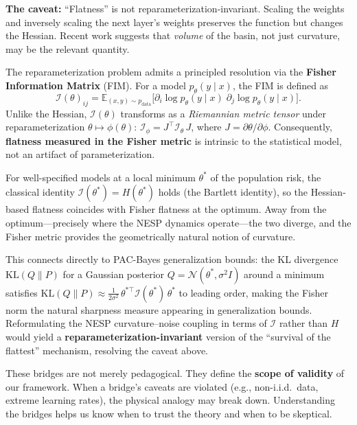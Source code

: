 \documentclass[
  journal=largetwo,
  year=2025,
  volume=37,
]{cup-journal}
\begin{document}
\textbf{The caveat:} ``Flatness'' is not reparameterization-invariant. Scaling the weights and inversely scaling the next layer's weights preserves the function but changes the Hessian. Recent work suggests that \textit{volume} of the basin, not just curvature, may be the relevant quantity.

\begin{remark}\label{rmk:fisher_flatness}
The reparameterization problem admits a principled resolution via the \textbf{Fisher Information Matrix} (FIM). For a model $p_\theta(y \mid x)$, the FIM is defined as
\begin{equation}\label{eq:fisher_information}
    \mathcal{I}(\theta)_{ij}
    = \mathbb{E}_{(x,y) \sim p_{\mathrm{data}}}
      \!\bigl[\partial_i \log p_\theta(y \mid x)\;\partial_j \log p_\theta(y \mid x)\bigr].
\end{equation}
Unlike the Hessian, $\mathcal{I}(\theta)$ transforms as a \emph{Riemannian metric tensor} under reparameterization $\theta \mapsto \phi(\theta)$:
$\mathcal{I}_\phi = J^\top \mathcal{I}_\theta\, J$, where $J = \partial\theta/\partial\phi$.
Consequently, \textbf{flatness measured in the Fisher metric} is intrinsic to the statistical model, not an artifact of parameterization.

For well-specified models at a local minimum $\theta^*$ of the population risk, the classical identity $\mathcal{I}(\theta^*) = H(\theta^*)$ holds (the Bartlett identity), so the Hessian-based flatness coincides with Fisher flatness at the optimum. Away from the optimum---precisely where the NESP dynamics operate---the two diverge, and the Fisher metric provides the geometrically natural notion of curvature.

This connects directly to PAC-Bayes generalization bounds: the KL divergence $\mathrm{KL}(Q \| P)$ for a Gaussian posterior $Q = \mathcal{N}(\theta^*, \sigma^2 I)$ around a minimum satisfies
$\mathrm{KL}(Q\|P) \approx \tfrac{1}{2\sigma^2}\,\theta^{*\top} \mathcal{I}(\theta^*)\,\theta^*$
to leading order, making the Fisher norm the natural sharpness measure appearing in generalization bounds. Reformulating the NESP curvature--noise coupling in terms of $\mathcal{I}$ rather than $H$ would yield a \textbf{reparameterization-invariant} version of the ``survival of the flattest'' mechanism, resolving the caveat above.
\end{remark}

\begin{remark}
These bridges are not merely pedagogical. They define the \textbf{scope of validity} of our framework. When a bridge's caveats are violated (e.g., non-i.i.d.\ data, extreme learning rates), the physical analogy may break down. Understanding the bridges helps us know when to trust the theory and when to be skeptical.
\end{remark}
\end{document}

